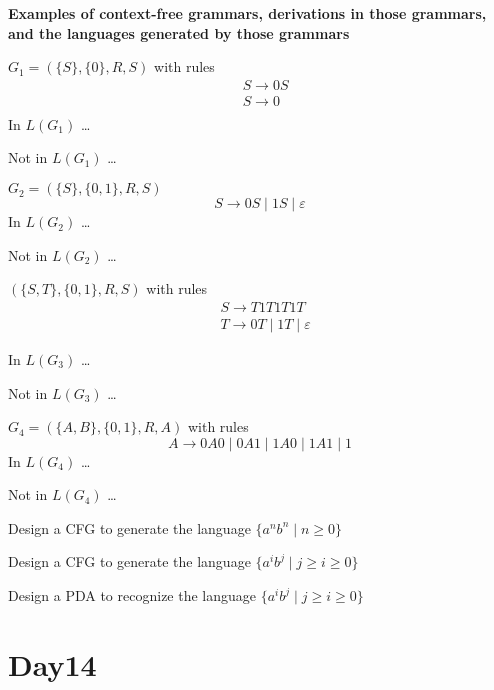 \documentclass[12pt, oneside]{article}
\begin{document}
\vfill

  
{\bf Examples of context-free grammars, derivations in those grammars, and the languages generated by those grammars}
  
$G_1 =  (\{S\}, \{0\}, R, S)$ with rules
  \begin{align*}
    &S \to 0S\\
    &S \to 0\\
  \end{align*}
  In  $L(G_1)$ \ldots 
  
\vfill

  Not in $L(G_1)$ \ldots 


\vfill

\newpage
  $G_2 =  (\{S\}, \{0,1\}, R, S)$
  \[
  S \to 0S \mid 1S \mid \varepsilon
  \]
  In  $L(G_2)$ \ldots 
  
  \vfill
  
  Not in $L(G_2)$ \ldots 

  \vfill

  $(\{S, T\}, \{0, 1\}, R, S)$ with  rules
  \begin{align*}
  &S \to T1T1T1T \\
  &T \to  0T \mid 1T \mid \varepsilon
  \end{align*}

  In  $L(G_3)$ \ldots 
  
  \vfill
  
  Not in $L(G_3)$ \ldots 

  \vfill

  $G_4 =  (\{A, B\}, \{0, 1\}, R, A)$ with rules
  \[
    A \to 0A0 \mid  0A1 \mid 1A0  \mid 1A1 \mid  1
  \]
  In  $L(G_4)$ \ldots 
  
  \vfill
  
  Not in $L(G_4)$ \ldots 

  \vfill

  
  \newpage
  Design a CFG to generate the  language $\{a^n b^n \mid  n  \geq  0\}$
  
  
  \vfill 


  Design a CFG to generate the  language $\{a^i b^j \mid j \geq i  \geq 0\}$
  
  \vfill
  
  Design a PDA to recognize the  language $\{a^i b^j \mid j \geq i  \geq 0\}$
  
  
  \vfill
  \newpage \vfill
\section*{Day14}
\end{document}
